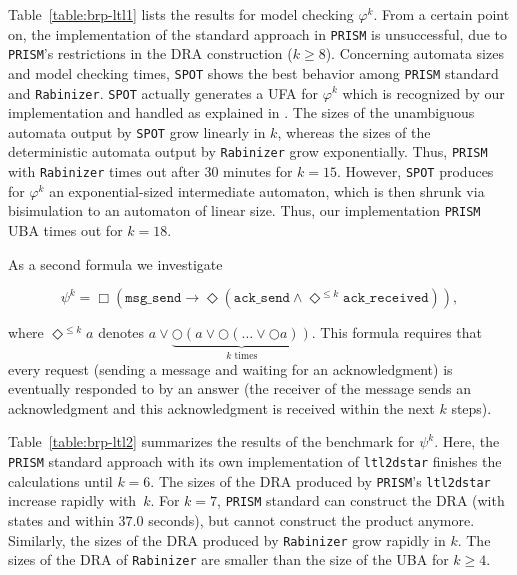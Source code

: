 \documentclass{elsarticle}
\newcommand{\finally}{\Diamond}
\newcommand{\globally}{\Box}
\newcommand{\neXt}{\bigcirc}
\newcommand{\pnodes}[1]{\nprounddigits{0}\numprint{#1}}
\newcommand{\prism}{\texttt{PRISM}}
\newcommand{\spot}{\texttt{SPOT}}
\newcommand{\ltltodstar}{\texttt{ltl2dstar}}
\newcommand{\rabinizer}{\texttt{Rabinizer}}
\begin{document}
Table~\ref{table:brp-ltl1} lists the results for model checking \(\varphi^k\).
From a certain point on, the implementation of the standard approach in \prism{}
is unsuccessful, due to \prism's restrictions in the DRA construction
($k\geqslant 8$). Concerning automata sizes and model checking times, \spot{}
shows the best behavior among \prism{} standard and \rabinizer{}.  \spot{}
actually generates a UFA for \(\varphi^k\) which is recognized by our
implementation and handled as explained in \cite{BenLenWor14}.  The sizes of the
unambiguous automata output by \spot{} grow linearly in $k$, whereas the
sizes of the deterministic automata output by \rabinizer{} grow
exponentially. Thus, \prism{} with \rabinizer{} times out after $30$
minutes for $k=15$.  However, \spot{} produces for $\varphi^k$ an
exponential-sized intermediate automaton, which is then shrunk via
bisimulation to an automaton of linear size. Thus, our implementation \prism{}
UBA times out for $k=18$.




As a second formula we investigate

\[\psi^k = \globally (\texttt{msg\_send} \rightarrow \finally
(\texttt{ack\_send} \wedge \finally^{\leqslant k} \texttt{ack\_received})),\]

where \(\finally^{\leqslant k} a\) denotes \(a \vee \underbrace{\neXt (a \vee
\neXt ( \ldots \vee \neXt a))}_{k \text{ times}}\). This formula requires that every request (sending a message and waiting for an
acknowledgment) is eventually responded to by an answer (the receiver of the
message sends an acknowledgment and this acknowledgment is received within the
next \(k\) steps).

Table~\ref{table:brp-ltl2} summarizes the results of the benchmark for
\(\psi^k\).  Here, the \prism{} standard approach with its own implementation of
\ltltodstar{} finishes the calculations until \(k=6\). The sizes of
the DRA produced by {\prism}'s \ltltodstar{} increase rapidly with~\(k\).
For \(k=7\), \prism{} standard can construct the DRA (with
\pnodes{67964} states and within \(37.0\) seconds), but cannot construct
the product anymore.  Similarly, the sizes of the DRA produced by \rabinizer{}
grow rapidly in \(k\). The sizes of the DRA of \rabinizer{} are smaller than the
size of the UBA for $k \geqslant 4$.
\end{document}
